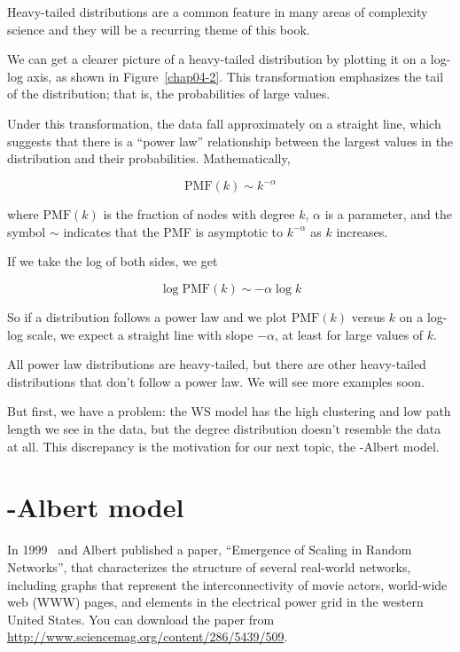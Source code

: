 \documentclass[12pt]{book}
\theoremstyle{exercise}
\begin{document}
Heavy-tailed distributions are a
common feature in many areas of complexity science and they will be a
recurring theme of this book.

We can get a clearer picture of a heavy-tailed distribution by
plotting it on a log-log axis, as shown in Figure~\ref{chap04-2}.
This transformation emphasizes the tail of the distribution; that
is, the probabilities of large values.

Under this transformation, the data fall approximately on a
straight line, which suggests that there is a ``power law''
relationship between the largest values in the distribution and their
probabilities.  Mathematically,

\newcommand{\PMF}{\mathrm{PMF}}
\newcommand{\CDF}{\mathrm{CDF}}
\newcommand{\CCDF}{\mathrm{CCDF}}

\[ \PMF(k) \sim k^{-\alpha} \]

where $\PMF(k)$ is the fraction of nodes with degree $k$, $\alpha$
is a parameter, and the symbol $\sim$ indicates that the PMF is
asymptotic to $k^{-\alpha}$ as $k$ increases.

If we take the log of both sides, we get

\[ \log \PMF(k) \sim -\alpha \log k \]

So if a distribution follows a power law and we plot $\PMF(k)$ versus
$k$ on a log-log scale, we expect a straight line with slope
$-\alpha$, at least for large values of $k$.

All power law distributions are heavy-tailed, but there are other
heavy-tailed distributions that don't follow a power law.  We will
see more examples soon.

But first, we have a problem: the WS model has the high clustering
and low path length we see in the data, but the degree distribution
doesn't resemble the data at all.  This discrepancy is the motivation
for our next topic, the \Barabasi-Albert model.


\section{\Barabasi-Albert model}
\label{scale.free}

In 1999 \Barabasi~and Albert published a paper,
``Emergence of Scaling in Random Networks'', that characterizes the
structure of several real-world networks,
including graphs that represent the interconnectivity of movie actors,
world-wide web (WWW) pages, and elements in the electrical power grid
in the western United States.  You can download the paper from
\url{http://www.sciencemag.org/content/286/5439/509}.
\end{document}
